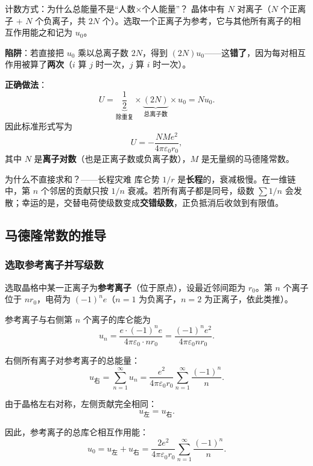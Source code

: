 \begin{modelbox}{计数方式：为什么总能量不是``人数$\times$个人能量''？}
晶体中有 $N$ 对离子（$N$ 个正离子 + $N$ 个负离子，共 $2N$ 个）。选取一个正离子为参考，它与其他所有离子的相互作用能之和记为 $u_0$。

\textbf{陷阱}：若直接把 $u_0$ 乘以总离子数 $2N$，得到 $(2N)u_0$——这\textbf{错了}，因为每对相互作用被算了\textbf{两次}（$i$ 算 $j$ 时一次，$j$ 算 $i$ 时一次）。

\textbf{正确做法}：
\[
  U = \underbrace{\frac{1}{2}}_{\text{除重复}} \times \underbrace{(2N)}_{\text{总离子数}} \times u_0
    = N u_0.
\]
因此标准形式写为
\[
  U = -\frac{N M e^2}{4\pi\varepsilon_0 r_0},
\]
其中 $N$ 是\textbf{离子对数}（也是正离子数或负离子数），$M$ 是无量纲的马德隆常数。
\end{modelbox}

\begin{insightbox}{为什么不直接求和？——长程灾难}
库仑势 $1/r$ 是\textbf{长程}的，衰减极慢。在一维链中，第 $n$ 个邻居的贡献只按 $1/n$ 衰减。若所有离子都是同号，级数 $\sum 1/n$ 会发散；幸运的是，交替电荷使级数变成\textbf{交错级数}，正负抵消后收敛到有限值。
\end{insightbox}

\subsection{马德隆常数的推导}

\subsubsection{选取参考离子并写级数}

选取晶格中某一正离子为\textbf{参考离子}（位于原点），设最近邻间距为 $r_0$。第 $n$ 个离子位于 $nr_0$，电荷为 $(-1)^n e$（$n=1$ 为负离子，$n=2$ 为正离子，依此类推）。

参考离子与右侧第 $n$ 个离子的库仑能为
\[
  u_n = \frac{e \cdot (-1)^n e}{4\pi\varepsilon_0 \cdot nr_0}
      = \frac{(-1)^n e^2}{4\pi\varepsilon_0 nr_0}.
\]

右侧所有离子对参考离子的总能量：
\[
  u_{\text{右}} = \sum_{n=1}^{\infty} u_n
               = \frac{e^2}{4\pi\varepsilon_0 r_0} \sum_{n=1}^{\infty} \frac{(-1)^n}{n}.
\]

由于晶格左右对称，左侧贡献完全相同：
\[
  u_{\text{左}} = u_{\text{右}}.
\]

因此，参考离子的总库仑相互作用能：
\[
  u_0 = u_{\text{左}} + u_{\text{右}}
      = \frac{2e^2}{4\pi\varepsilon_0 r_0} \sum_{n=1}^{\infty} \frac{(-1)^n}{n}. \tag{1}
\]

